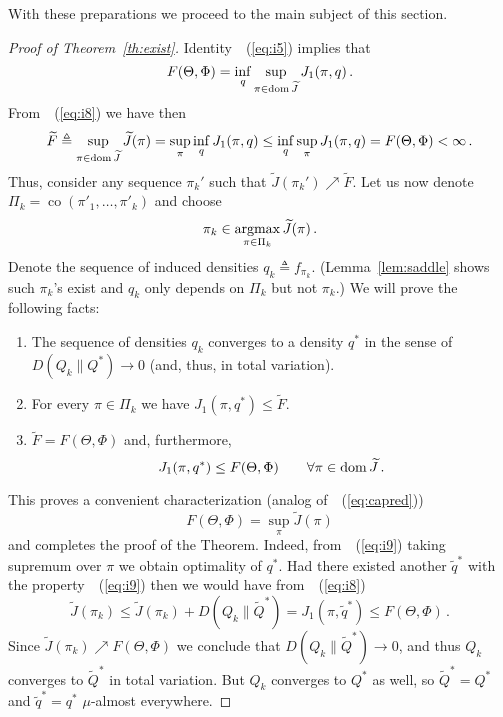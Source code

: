 \documentclass[12pt]{colt2021} %
\theoremstyle{remark}
\newcommand{\eqref}[1]{~(\ref{#1})}
\def\argmax{\mathop{\rm argmax}}
\def\eqdef{\triangleq}
\def\upto{\nearrow}
\newcommand{\co}{\mathop{\mathrm{co}}}
\renewcommand{\tilde}{\widetilde}
\begin{document}
	With these preparations we proceed to the main subject of this section. 
	\begin{proof}[Proof of Theorem~\ref{th:exist}]
		Identity~\eqref{eq:i5} implies that
			$$ F(\Theta,\Phi) = \inf_q \sup_{\pi \in \dom \tilde J} J_1(\pi,q)\,.$$
			From~\eqref{eq:i8} we have then
			\begin{equation}\label{eq:i11}
				\tilde F \eqdef \sup_{\pi \in \dom \tilde J} \tilde J(\pi) = \sup_\pi \inf_q J_1(\pi,q) \le \inf_q \sup_\pi
			J_1(\pi,q) = F(\Theta,\Phi) < \infty\,.
\end{equation}			
			Thus, consider any sequence $\pi_k'$ such that $\tilde J(\pi_k')\upto \tilde F$. Let us
			now denote $\Pi_k = \co(\pi'_1,\ldots,\pi'_k)$ and choose 
			$$\pi_k \in \argmax_{\pi \in \Pi_k} \tilde J(\pi)\,.$$
			Denote the sequence of induced densities $q_k \eqdef f_{\pi_k}$. (Lemma~\ref{lem:saddle} shows
			such $\pi_k$'s exist and $q_k$ only depends on $\Pi_k$ but not $\pi_k$.)
			We will prove the following facts:
			\begin{enumerate}
			\item The sequence of densities $q_k$ converges to a density $q^*$ in the sense of
			$D(Q_k\|Q^*) \to 0$ (and, thus, in total variation).
			\item %
				For every $\pi \in \Pi_k$ we have $J_1(\pi, q^*) \le \tilde F$.
			\item $\tilde F = F(\Theta,\Phi)$ and, furthermore, 
				\begin{equation}\label{eq:i9}
					J_1(\pi,q^*) \le F(\Theta,\Phi) \qquad \forall\pi \in \dom \tilde J\,.
			\end{equation}				
			\end{enumerate}
			This proves a convenient characterization (analog of~\eqref{eq:capred})
			\begin{equation}\label{eq:f_capred}
					F(\Theta,\Phi) = \sup_{\pi} \tilde J(\pi) 
			\end{equation}				
			and completes the proof of the Theorem. Indeed, from~\eqref{eq:i9} taking supremum over
			$\pi$ we obtain optimality of $q^*$. Had there existed another $\tilde q^*$ with the
			property~\eqref{eq:i9} then we would have from~\eqref{eq:i8}
				$$ \tilde J(\pi_k) \le \tilde J(\pi_k) + D(Q_k\|\tilde Q^*) = J_1(\pi,\tilde q^*) \le
				F(\Theta,\Phi)\,.$$
				Since $\tilde J(\pi_k)\upto F(\Theta,\Phi)$ we conclude that $D(Q_k\|\tilde Q^*)\to 0$,
				and thus $Q_k$ converges to $\tilde Q^*$ in total variation. But $Q_k$ converges to
				$Q^*$ as well, so $\tilde Q^*=Q^*$ and $\tilde q^*=q^*$ $\mu$-almost everywhere.


\end{proof}
\end{document}
